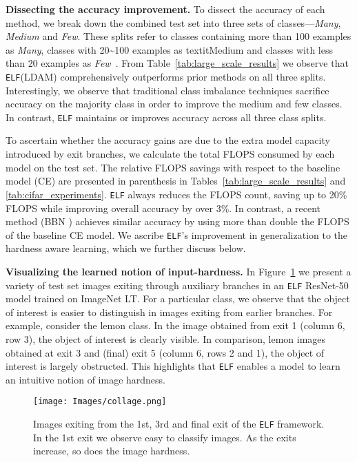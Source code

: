 \documentclass{article}
\newcommand{\method}{\texttt{ELF}\xspace}
\begin{document}
\textbf{Dissecting the accuracy improvement.}
To dissect the accuracy of each method, we break down the combined test set into three sets of classes---\textit{Many}, \textit{Medium} and \textit{Few}.
These splits refer to classes containing more than 100 examples as \textit{Many}, classes with 20\textasciitilde{}100 examples as textit{Medium} and classes with less than 20 examples as \textit{Few}~\cite{kang2019decoupling}. 
From Table~\ref{tab:large_scale_results} we observe that \method{\scriptsize (LDAM)} comprehensively outperforms prior methods on all three splits. 
Interestingly, we observe that traditional class imbalance techniques sacrifice accuracy on the majority class in order to improve the medium and few classes.
In contrast, \method{} maintains or improves accuracy across all three class splits.

To ascertain whether the accuracy gains are due to the extra model capacity introduced by exit branches, we calculate the total FLOPS consumed by each model on the test set.  
The relative FLOPS savings with respect to the baseline model (CE) are presented in parenthesis in Tables~\ref{tab:large_scale_results} and \ref{tab:cifar_experiments}. 
\method{} always reduces the FLOPS count, saving up to 20\% FLOPS while improving overall accuracy by over 3\%. 
In contrast, a recent method (BBN \cite{zhou2019bbn}) achieves similar accuracy by using more than double the FLOPS of the baseline CE model.
We ascribe \method's improvement in generalization to the hardness aware learning, which we further discuss below.


\textbf{Visualizing the learned notion of input-hardness.}
In Figure~\ref{fig:image-difficulty} we present a variety of test set images exiting through auxiliary branches in an \method{} ResNet-50 model trained on ImageNet LT. 
For a particular class, we observe that the object of interest is easier to distinguish in images exiting from earlier branches.
For example, consider the lemon class. In the image obtained from exit 1 (column 6, row 3), the object of interest is clearly visible.
In comparison, lemon images obtained at exit 3 and (final) exit 5 (column 6, rows 2 and 1), the object of interest is largely obstructed. 
This highlights that \method{} enables a model to learn an intuitive notion of image hardness. 




\begin{figure}[t!]
    \centering
    \texttt{[image: Images/collage.png]}
    \caption{Images exiting from the 1st, 3rd and final exit of the \method{} framework. 
    In the 1st exit we observe easy to classify images. As the exits increase, so does the image hardness.
    }
    \label{fig:image-difficulty}
\end{figure}
\end{document}
